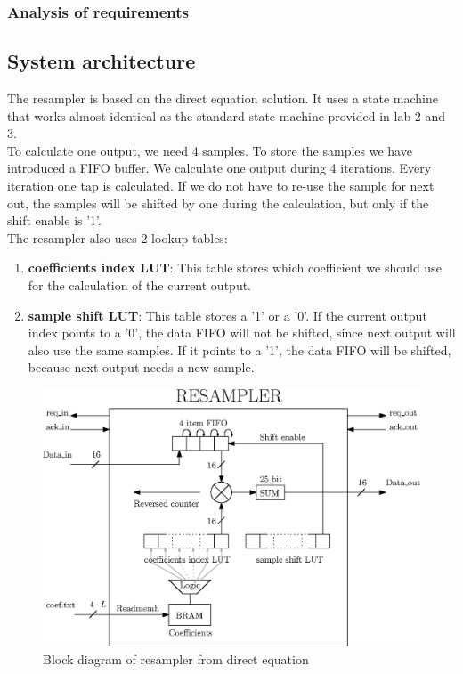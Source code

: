 \documentclass[a4paper,twoside,11pt, fleqn]{article}
\begin{document}
\subsubsection{Analysis of requirements}

\newpage
\subsection{System architecture}
The resampler is based on the direct equation solution. It uses a state machine that works almost identical as the standard state machine provided in lab 2 and 3. \\

To calculate one output, we need 4 samples. To store the samples we have introduced a FIFO buffer. We calculate one output during 4 iterations.  Every iteration one tap is calculated. If we do not have to re-use the sample for next out, the samples will be shifted by one during the calculation, but only if the shift enable is '1'.\\

The resampler also uses 2 lookup tables:
\begin{enumerate}
\item \textbf{coefficients index LUT}: This table stores which coefficient we should use for the calculation of the current output.
\item \textbf{sample shift LUT}: This table stores a '1' or a '0'. If the current output index points to a '0', the data FIFO will not be shifted, since next output will also use the same samples. If it points to a '1', the data FIFO  will be shifted, because next output needs a new sample.
\end{enumerate}

\begin{figure}[h]
	\includegraphics[scale = 1]{Images/4_blockdiagram}
    \caption{Block diagram of resampler from direct equation}
\end{figure}
\end{document}

